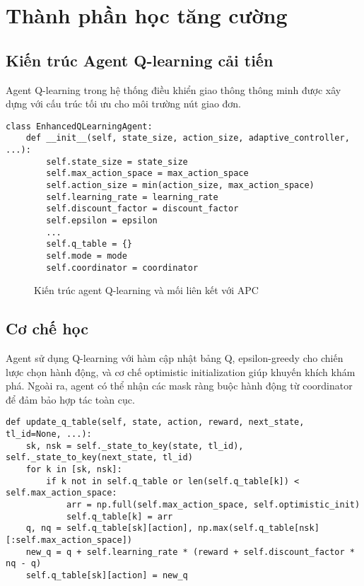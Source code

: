 \chapter{Thành phần học tăng cường}

\section{Kiến trúc Agent Q-learning cải tiến}

Agent Q-learning trong hệ thống điều khiển giao thông thông minh được xây dựng với cấu trúc tối ưu cho môi trường nút giao đơn.

\begin{lstlisting}[style=py,caption={Lớp EnhancedQLearningAgent}]
class EnhancedQLearningAgent:
    def __init__(self, state_size, action_size, adaptive_controller, ...):
        self.state_size = state_size
        self.max_action_space = max_action_space
        self.action_size = min(action_size, max_action_space)
        self.learning_rate = learning_rate
        self.discount_factor = discount_factor
        self.epsilon = epsilon
        ...
        self.q_table = {}
        self.mode = mode
        self.coordinator = coordinator
\end{lstlisting}

\begin{figure}[H]
    \centering
    \caption{Kiến trúc agent Q-learning và mối liên kết với APC}
\end{figure}

\section{Cơ chế học}

Agent sử dụng Q-learning với hàm cập nhật bảng Q, epsilon-greedy cho chiến lược chọn hành động, và cơ chế optimistic initialization giúp khuyến khích khám phá. Ngoài ra, agent có thể nhận các mask ràng buộc hành động từ coordinator để đảm bảo hợp tác toàn cục.

\begin{lstlisting}[style=py,caption={Hàm cập nhật Q-table}]
def update_q_table(self, state, action, reward, next_state, tl_id=None, ...):
    sk, nsk = self._state_to_key(state, tl_id), self._state_to_key(next_state, tl_id)
    for k in [sk, nsk]:
        if k not in self.q_table or len(self.q_table[k]) < self.max_action_space:
            arr = np.full(self.max_action_space, self.optimistic_init)
            self.q_table[k] = arr
    q, nq = self.q_table[sk][action], np.max(self.q_table[nsk][:self.max_action_space])
    new_q = q + self.learning_rate * (reward + self.discount_factor * nq - q)
    self.q_table[sk][action] = new_q
\end{lstlisting}

